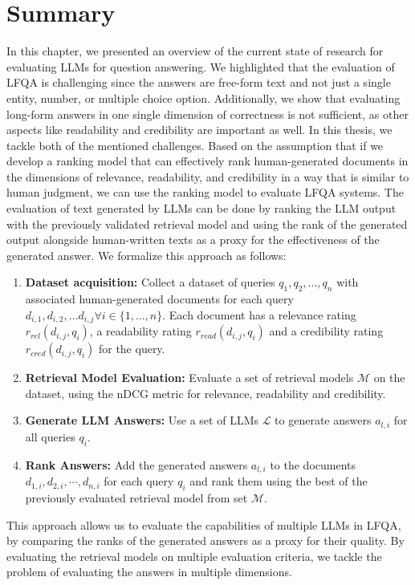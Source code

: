 \section{Summary}
In this chapter, we presented an overview of the current state of research for evaluating LLMs for question answering.
We highlighted that the evaluation of LFQA is challenging since the answers are free-form text and not just a single entity, number, or multiple choice option.
Additionally, we show that evaluating long-form answers in one single dimension of correctness is not sufficient, as other aspects like readability and credibility are important as well.
In this thesis, we tackle both of the mentioned challenges.
Based on the assumption that if we develop a ranking model that can effectively rank human-generated documents in the dimensions of relevance, readability, and credibility in a way that is similar to human judgment, we can use the ranking model to evaluate LFQA systems.
The evaluation of text generated by LLMs can be done by ranking the LLM output with the previously validated retrieval model and using the rank of the generated output alongside human-written texts as a proxy for the effectiveness of the generated answer.
We formalize this approach as follows:
\begin{enumerate}
    \item \textbf{Dataset acquisition:} Collect a dataset of queries \( q_1, q_2, \ldots, q_n \) with associated human-generated documents for each query \( d_{i,1}, d_{i,2}, \ldots d_{i,j} \forall i \in \{1, \ldots, n\} \). Each document has a relevance rating \( r_{rel}(d_{i,j}, q_i) \), a readability rating \( r_{read}(d_{i,j}, q_i) \) and a credibility rating \( r_{cred}(d_{i,j}, q_i) \) for the query.
    \item \textbf{Retrieval Model Evaluation:} Evaluate a set of retrieval models \( \mathcal{M}\) on the dataset, using the nDCG metric for relevance, readability and credibility.
    \item \textbf{Generate LLM Answers:} Use a set of LLMs \( \mathcal{L} \) to generate answers \( a_{l,i} \) for all queries \( q_i \).
    \item \textbf{Rank Answers:} Add the generated answers \( a_{l,i} \) to the documents \(d_{1,i}, d_{2,i}, \cdots, d_{n,i} \) for each query \( q_i \) and rank them using the best of the previously evaluated retrieval model from set \( \mathcal{M} \).
\end{enumerate}
This approach allows us to evaluate the capabilities of multiple LLMs in LFQA, by comparing the ranks of the generated answers as a proxy for their quality.
By evaluating the retrieval models on multiple evaluation criteria, we tackle the problem of evaluating the answers in multiple dimensions.